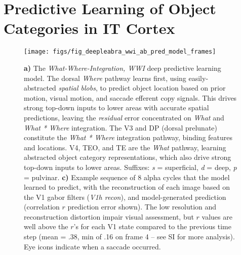\documentclass[11pt,twoside]{article}
\newif\myifpdf
\begin{document}
\section{Predictive Learning of Object Categories in IT Cortex}

\begin{figure}
  \centering\texttt{[image: figs/fig\_deepleabra\_wwi\_ab\_pred\_model\_frames]}
  \caption{{\bf a)} The \emph{What-Where-Integration, WWI} deep predictive learning model. The dorsal \emph{Where} pathway learns first, using easily-abstracted \emph{spatial blobs}, to predict object location based on prior motion, visual motion, and saccade efferent copy signals.  This drives strong top-down inputs to lower areas with accurate spatial predictions, leaving the \emph{residual} error concentrated on \emph{What} and \emph{What * Where} integration.  The V3 and DP (dorsal prelunate) constitute the \emph{What * Where} integration pathway, binding features and locations.  V4, TEO, and TE are the \emph{What} pathway, learning abstracted object category representations, which also drive strong top-down inputs to lower areas.  Suffixes: \emph{s} = superficial, \emph{d} = deep, \emph{p} = pulvinar. {\bf c)} Example sequence of 8 alpha cycles that the model learned to predict, with the reconstruction of each image based on the V1 gabor filters (\emph{V1h recon}), and model-generated prediction (correlation $r$ prediction error shown).  The low resolution and reconstruction distortion impair visual assessment, but $r$ values are well above the $r$'s for each V1 state compared to the previous time step (mean = .38, min of .16 on frame 4 -- see SI for more analysis).  Eye icons indicate when a saccade occurred.}
  \label{fig.model}
\end{figure}
\end{document}
